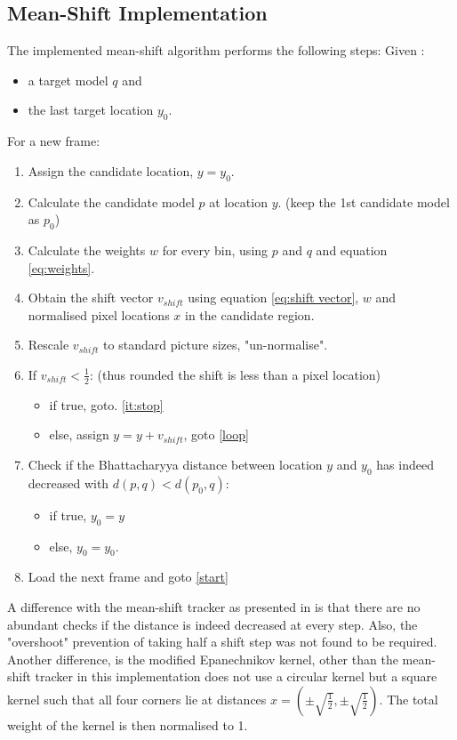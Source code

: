 \documentclass[a4paper,11pt]{article}
\begin{document}
\subsection{Mean-Shift Implementation}
The  implemented mean-shift algorithm performs the following steps:
Given : 
\begin{itemize}
\item a target model $q$ and
\item the last target location $y_0$.
\end{itemize}
For a new frame:
\begin{enumerate}
\item \label{start} Assign the candidate location, $y = y_0$.
\item \label{loop} Calculate the candidate model $p$ at location $y$. (keep the 1st candidate model as $p_0$)
\item Calculate the weights $w$ for every bin, using $p$ and $q$ and equation \ref{eq:weights}.
\item Obtain the shift vector $v_{shift}$ using equation \ref{eq:shift vector}, $w$ and normalised pixel locations $x$ in the candidate region.
\item Rescale $v_{shift}$ to standard picture sizes, "un-normalise".
\item If $v_{shift} < \frac{1}{2}$: (thus rounded the shift is less than a pixel location)
\begin{itemize}
\item if true, goto. \ref{it:stop}
\item else, assign $y=y+v_{shift}$, goto \ref{loop}
\end{itemize}
\item \label{it:stop} Check if the Bhattacharyya distance between location $y$ and $y_0$ has indeed decreased with $d(p,q) < d(p_0,q)$: 
\begin{itemize}
\item if true, $y_0 = y$
\item else, $y_0 = y_0$.
\end{itemize}
\item Load the next frame and goto \ref{start}
\end{enumerate}

A difference with the mean-shift tracker as presented in \cite{mean_shift} is that there are no abundant checks if the distance is indeed decreased at every step. Also, the "overshoot" prevention of taking half a shift step was not found to be required. Another difference, is the modified  Epanechnikov kernel, other than the mean-shift tracker in \cite{mean_shift} this implementation does not use a circular kernel but a square kernel such that all four corners lie at distances $x=(\pm \sqrt{\frac{1}{2}},\pm \sqrt{\frac{1}{2}})$. The total weight of the kernel is then normalised to 1.
\end{document}
